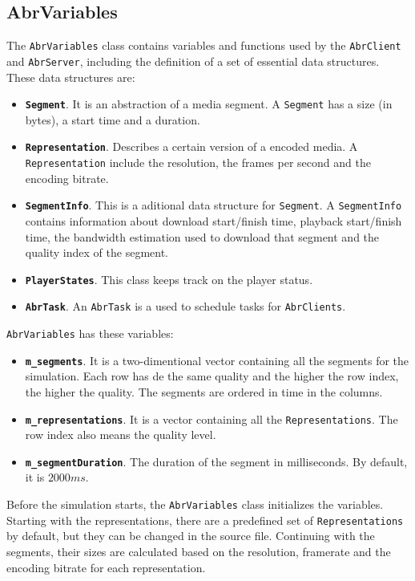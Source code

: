 \subsection{AbrVariables}

The \texttt{AbrVariables} class contains variables and functions used by the
\texttt{AbrClient} and \texttt{AbrServer}, including the definition of 
a set of essential data structures. These data structures are:

\begin{itemize}[noitemsep, topsep=0pt]
  \item \texttt{\textbf{Segment}}. It is an abstraction of a media segment. A \texttt{Segment} 
  has a size (in bytes), a start time and a duration.
  \item \texttt{\textbf{Representation}}. Describes a certain version of a encoded media. A \texttt{Representation}
  include the resolution, the frames per second and the encoding bitrate.
  \item \texttt{\textbf{SegmentInfo}}. This is a aditional data structure for \texttt{Segment}. A \texttt{SegmentInfo} contains 
  information about download start/finish time, playback start/finish time, the bandwidth estimation
  used to download that segment and the quality index of the segment.
  \item \texttt{\textbf{PlayerStates}}. This class keeps track on the player status.
  \item \texttt{\textbf{AbrTask}}. An \texttt{AbrTask} is a used to schedule tasks for \texttt{AbrClients}.
\end{itemize}

\texttt{AbrVariables} has these variables:
\begin{itemize}[noitemsep, topsep=0pt]
  \item \texttt{\textbf{m\_segments}}. It is a two-dimentional vector containing all the segments 
  for the simulation. Each row has de the same quality and the higher the row index, the higher the
  quality. The segments are ordered in time in the columns.
  \item \texttt{\textbf{m\_representations}}. It is a vector containing all the \texttt{Representations}.
  The row index also means the quality level.
  \item \texttt{\textbf{m\_segmentDuration}}. The duration of the segment in milliseconds. By default, it is ${2000ms}$.
\end{itemize}

Before the simulation starts, the \texttt{AbrVariables} class initializes the
variables. Starting with the representations, there are a predefined set of \texttt{Representations}
by default, but they can be changed in the source file. 
Continuing with the segments, their sizes are calculated based on the resolution,
framerate and the encoding bitrate for each representation. 


